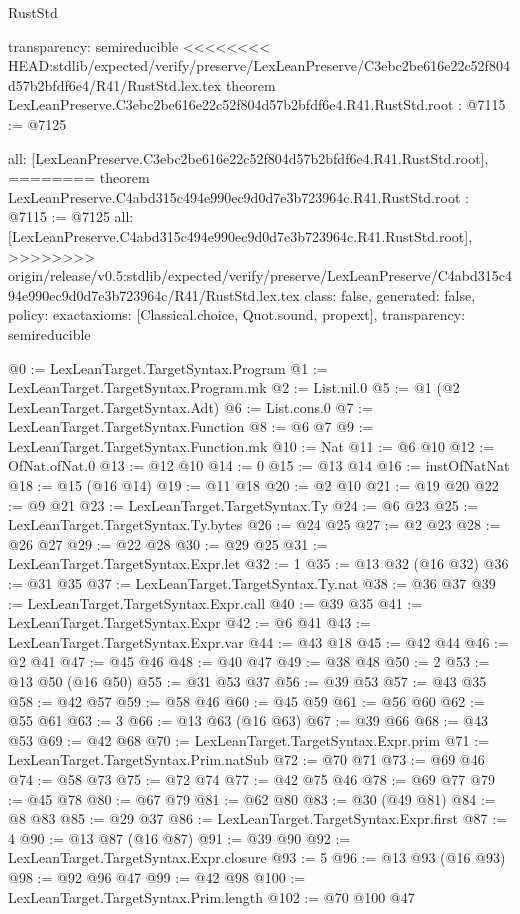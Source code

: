 \begin{lexlean}{RustStd}
\begin{coremodule}
{\begin{coremodule}
{{{{{{{{{{{{{{  transparency: semireducible
}
<<<<<<<< HEAD:stdlib/expected/verify/preserve/LexLeanPreserve/C3ebc2be616e22c52f804d57b2bfdf6e4/R41/RustStd.lex.tex
theorem LexLeanPreserve.C3ebc2be616e22c52f804d57b2bfdf6e4.R41.RustStd.root : @7115 := @7125 {
  all: [LexLeanPreserve.C3ebc2be616e22c52f804d57b2bfdf6e4.R41.RustStd.root],
========
theorem LexLeanPreserve.C4abd315c494e990ec9d0d7e3b723964c.R41.RustStd.root : @7115 := @7125 {
  all: [LexLeanPreserve.C4abd315c494e990ec9d0d7e3b723964c.R41.RustStd.root],
>>>>>>>> origin/release/v0.5:stdlib/expected/verify/preserve/LexLeanPreserve/C4abd315c494e990ec9d0d7e3b723964c/R41/RustStd.lex.tex
  class: false,
  generated: false,
  policy: exact{axioms: [Classical.choice, Quot.sound, propext]},
  transparency: semireducible
}

@0 := LexLeanTarget.TargetSyntax.Program
@1 := LexLeanTarget.TargetSyntax.Program.mk
@2 := List.nil.{0}
@5 := @1 (@2 LexLeanTarget.TargetSyntax.Adt)
@6 := List.cons.{0}
@7 := LexLeanTarget.TargetSyntax.Function
@8 := @6 @7
@9 := LexLeanTarget.TargetSyntax.Function.mk
@10 := Nat
@11 := @6 @10
@12 := OfNat.ofNat.{0}
@13 := @12 @10
@14 := 0
@15 := @13 @14
@16 := instOfNatNat
@18 := @15 (@16 @14)
@19 := @11 @18
@20 := @2 @10
@21 := @19 @20
@22 := @9 @21
@23 := LexLeanTarget.TargetSyntax.Ty
@24 := @6 @23
@25 := LexLeanTarget.TargetSyntax.Ty.bytes
@26 := @24 @25
@27 := @2 @23
@28 := @26 @27
@29 := @22 @28
@30 := @29 @25
@31 := LexLeanTarget.TargetSyntax.Expr.let
@32 := 1
@35 := @13 @32 (@16 @32)
@36 := @31 @35
@37 := LexLeanTarget.TargetSyntax.Ty.nat
@38 := @36 @37
@39 := LexLeanTarget.TargetSyntax.Expr.call
@40 := @39 @35
@41 := LexLeanTarget.TargetSyntax.Expr
@42 := @6 @41
@43 := LexLeanTarget.TargetSyntax.Expr.var
@44 := @43 @18
@45 := @42 @44
@46 := @2 @41
@47 := @45 @46
@48 := @40 @47
@49 := @38 @48
@50 := 2
@53 := @13 @50 (@16 @50)
@55 := @31 @53 @37
@56 := @39 @53
@57 := @43 @35
@58 := @42 @57
@59 := @58 @46
@60 := @45 @59
@61 := @56 @60
@62 := @55 @61
@63 := 3
@66 := @13 @63 (@16 @63)
@67 := @39 @66
@68 := @43 @53
@69 := @42 @68
@70 := LexLeanTarget.TargetSyntax.Expr.prim
@71 := LexLeanTarget.TargetSyntax.Prim.natSub
@72 := @70 @71
@73 := @69 @46
@74 := @58 @73
@75 := @72 @74
@77 := @42 @75 @46
@78 := @69 @77
@79 := @45 @78
@80 := @67 @79
@81 := @62 @80
@83 := @30 (@49 @81)
@84 := @8 @83
@85 := @29 @37
@86 := LexLeanTarget.TargetSyntax.Expr.first
@87 := 4
@90 := @13 @87 (@16 @87)
@91 := @39 @90
@92 := LexLeanTarget.TargetSyntax.Expr.closure
@93 := 5
@96 := @13 @93 (@16 @93)
@98 := @92 @96 @47
@99 := @42 @98
@100 := LexLeanTarget.TargetSyntax.Prim.length
@102 := @70 @100 @47
}}}}}}}}}}}}}}
\end{coremodule}}
\end{coremodule}
\end{lexlean}
